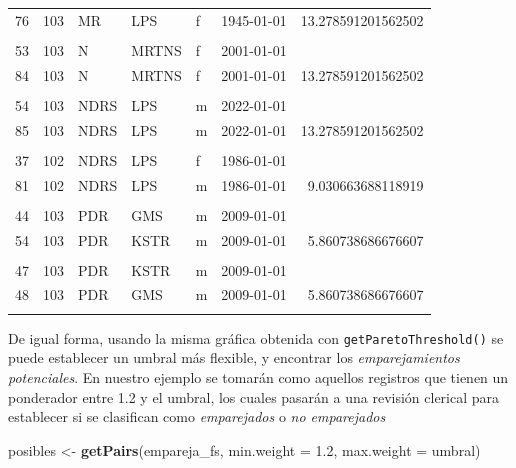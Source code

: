 \documentclass[
  12pt,
]{book}
\newenvironment{Shaded}{\begin{snugshade}}{\end{snugshade}}
\newcommand{\AttributeTok}[1]{\textcolor[rgb]{0.13,0.29,0.53}{#1}}
\newcommand{\FloatTok}[1]{\textcolor[rgb]{0.00,0.00,0.81}{#1}}
\newcommand{\FunctionTok}[1]{\textcolor[rgb]{0.13,0.29,0.53}{\textbf{#1}}}
\newcommand{\NormalTok}[1]{#1}
\newcommand{\OtherTok}[1]{\textcolor[rgb]{0.56,0.35,0.01}{#1}}
\begin{document}
\begin{table}[t]
\begin{tabular*}{1\linewidth}{@{\extracolsep{\fill}}rrlllrr}
76 & 103 & MR & LPS & f & 1945-01-01 & 13.278591201562502 \\ 
 &  &  &  &  &  &  \\ 
53 & 103 & N & MRTNS & f & 2001-01-01 &  \\ 
84 & 103 & N & MRTNS & f & 2001-01-01 & 13.278591201562502 \\ 
 &  &  &  &  &  &  \\ 
54 & 103 & NDRS & LPS & m & 2022-01-01 &  \\ 
85 & 103 & NDRS & LPS & m & 2022-01-01 & 13.278591201562502 \\ 
 &  &  &  &  &  &  \\ 
37 & 102 & NDRS & LPS & f & 1986-01-01 &  \\ 
81 & 102 & NDRS & LPS & m & 1986-01-01 &  9.030663688118919 \\ 
 &  &  &  &  &  &  \\ 
44 & 103 & PDR & GMS & m & 2009-01-01 &  \\ 
54 & 103 & PDR & KSTR & m & 2009-01-01 &  5.860738686676607 \\ 
 &  &  &  &  &  &  \\ 
47 & 103 & PDR & KSTR & m & 2009-01-01 &  \\ 
48 & 103 & PDR & GMS & m & 2009-01-01 &  5.860738686676607 \\ 
 &  &  &  &  &  &  \\ 
\bottomrule
\end{tabular*}
\end{table}

De igual forma, usando la misma gráfica obtenida con \texttt{getParetoThreshold()} se puede establecer un umbral más flexible, y encontrar los \emph{emparejamientos potenciales}. En nuestro ejemplo se tomarán como aquellos registros que tienen un ponderador entre 1.2 y el umbral, los cuales pasarán a una revisión clerical para establecer si se clasifican como \emph{emparejados} o \emph{no emparejados}

\begin{Shaded}
\begin{Highlighting}[]
\NormalTok{posibles }\OtherTok{\textless{}{-}} \FunctionTok{getPairs}\NormalTok{(empareja\_fs, }\AttributeTok{min.weight =} \FloatTok{1.2}\NormalTok{, }\AttributeTok{max.weight =}\NormalTok{ umbral)}
\end{Highlighting}
\end{Shaded}
\end{document}
